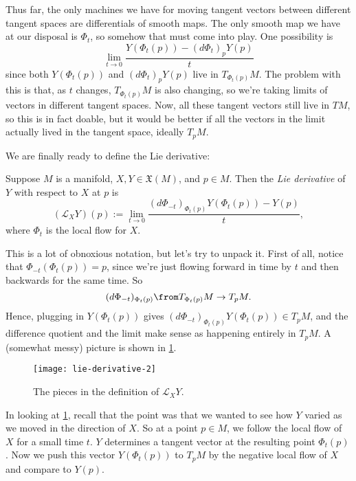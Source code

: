 Thus far, the only machines we have for moving tangent vectors between different tangent spaces are differentials of smooth maps. The only smooth map we have at our disposal is $\Phi_t$, so somehow that must come into play. One possibility is
\[
	\lim_{t \to 0} \frac{Y(\Phi_t(p)) - (d \Phi_t)_p Y(p)}{t}
\]
since both $Y(\Phi_t(p))$ and $(d \Phi_t)_pY(p)$ live in $T_{\Phi_t(p)}M$. The problem with this is that, as $t$ changes, $T_{\Phi_t(p)}M$ is also changing, so we're taking limits of vectors in different tangent spaces. Now, all these tangent vectors still live in $TM$, so this is in fact doable, but it would be better if all the vectors in the limit actually lived in the tangent space, ideally $T_pM$. 

We are finally ready to define the Lie derivative:

\begin{definition}\label{def:Lie derivative}
	Suppose $M$ is a manifold, $X,Y \in \mathfrak{X}(M)$, and $p \in M$. Then the \emph{Lie derivative} of $Y$ with respect to $X$ at $p$ is
	\[
		(\mathcal{L}_XY)(p) := \lim_{t \to 0} \frac{(d \Phi_{-t})_{\Phi_t(p)}Y(\Phi_t(p)) - Y(p)}{t},
	\]
	where $\Phi_t$ is the local flow for $X$.
\end{definition}

This is a lot of obnoxious notation, but let's try to unpack it. First of all, notice that $\Phi_{-t}(\Phi_t(p)) = p$, since we're just flowing forward in time by $t$ and then backwards for the same time. So
\[
	(d\Phi_{-t})_{\Phi_t(p)}\from T_{\Phi_t(p)}M \to T_p M.
\]
Hence, plugging in $Y(\Phi_t(p))$ gives $(d\Phi_{-t})_{\Phi_t(p)}Y(\Phi_t(p)) \in T_pM$, and the difference quotient and the limit make sense as happening entirely in $T_pM$. A (somewhat messy) picture is shown in \cref{fig:lie-derivative2}.

\begin{figure}[htbp]
	\centering
		\texttt{[image: lie-derivative-2]}
	\caption{The pieces in the definition of $\mathcal{L}_XY$.}
	\label{fig:lie-derivative2}
\end{figure}

In looking at \cref{fig:lie-derivative2}, recall that the point was that we wanted to see how $Y$ varied as we moved in the direction of $X$. So at a point $p \in M$, we follow the local flow of $X$ for a small time $t$. $Y$ determines a tangent vector at the resulting point $\Phi_t(p)$. Now we push this vector $Y(\Phi_t(p))$ to $T_pM$ by the negative local flow of $X$ and compare to $Y(p)$.

